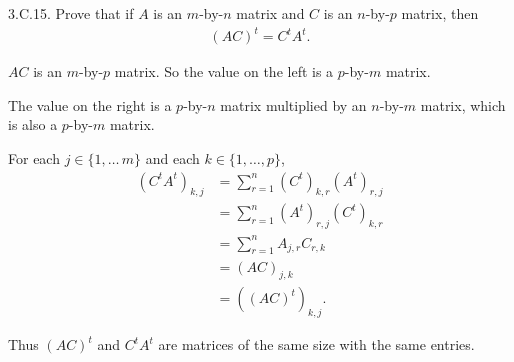 \documentclass[a5paper]{article}
\begin{document}
\newcommand   \C           {\mathbf{C}}
\newcommand   \R           {\mathbf{R}}
\renewcommand \L           {\mathcal{L}}
\newcommand   \F           {\mathbf{F}}
\renewcommand \P           {\mathcal{P}}
\newcommand   \M           {\mathcal{M}}
\newcommand   \op          {\operatorname}


    3.C.15.
    Prove that if $A$ is an $m$-by-$n$ matrix and $C$ is an $n$-by-$p$ matrix, then
\begin{align*}
        (AC)^t = C^t A^t .
\end{align*}

    $AC$ is an $m$-by-$p$ matrix.
    So the value on the left is a $p$-by-$m$ matrix.

    The value on the right is a $p$-by-$n$ matrix multiplied by an $n$-by-$m$ matrix, which is also a $p$-by-$m$ matrix.

    For each $j \in \{1,\dots\,m\}$ and each $k \in \{1,\dots,p\}$,
\begin{align*}
        (C^t A^t)_{k,j} &= \sum_{r=1}^n (C^t)_{k,r} (A^t)_{r,j} \\
                        &= \sum_{r=1}^n (A^t)_{r,j} (C^t)_{k,r} \\
                        &= \sum_{r=1}^n A_{j,r} C_{r,k} \\
                        &= (AC)_{j,k} \\
                        &= ((AC)^t)_{k,j} .
\end{align*}

    Thus $(AC)^t$ and $C^tA^t$ are matrices of the same size with the same entries.
\end{document}
